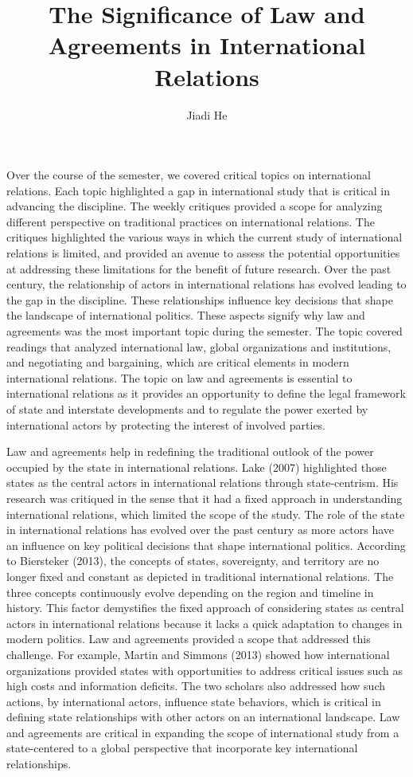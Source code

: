 \documentclass[11pt]{article}
\title{The Significance of Law and Agreements in International Relations}
\author{Jiadi He}
\begin{document}
\maketitle
\keywordsline

Over the course of the semester, we covered critical topics on international relations. Each topic highlighted a gap in international study that is critical in advancing the discipline. The weekly critiques provided a scope for analyzing different perspective on traditional practices on international relations. The critiques highlighted the various ways in which the current study of international relations is limited, and provided an avenue to assess the potential opportunities at addressing these limitations for the benefit of future research. Over the past century, the relationship of actors in international relations has evolved leading to the gap in the discipline. These relationships influence key decisions that shape the landscape of international politics. These aspects signify why law and agreements was the most important topic during the semester. The topic covered readings that analyzed international law, global organizations and institutions, and negotiating and bargaining, which are critical elements in modern international relations. The topic on law and agreements is essential to international relations as it provides an opportunity to define the legal framework of state and interstate developments and to regulate the power exerted by international actors by protecting the interest of involved parties.

Law and agreements help in redefining the traditional outlook of the power occupied by the state in international relations. Lake (2007) highlighted those states as the central actors in international relations through state-centrism. His research was critiqued in the sense that it had a fixed approach in understanding international relations, which limited the scope of the study. The role of the state in international relations has evolved over the past century as more actors have an influence on key political decisions that shape international politics. According to Biersteker (2013), the concepts of states, sovereignty, and territory are no longer fixed and constant as depicted in traditional international relations. The three concepts continuously evolve depending on the region and timeline in history. This factor demystifies the fixed approach of considering states as central actors in international relations because it lacks a quick adaptation to changes in modern politics. Law and agreements provided a scope that addressed this challenge. For example, Martin and Simmons (2013) showed how international organizations provided states with opportunities to address critical issues such as high costs and information deficits. The two scholars also addressed how such actions, by international actors, influence state behaviors, which is critical in defining state relationships with other actors on an international landscape. Law and agreements are critical in expanding the scope of international study from a state-centered to a global perspective that incorporate key international relationships.
\end{document}
